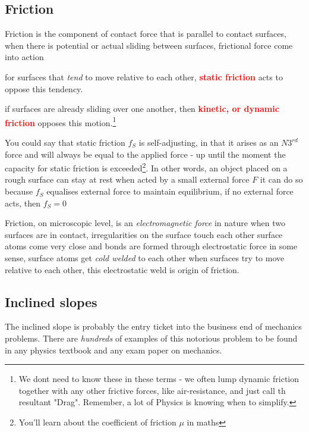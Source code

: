 \documentclass[a4paper,12pt]{book}
\newcounter{example}[chapter]
\newcommand{\piste}{{\fontencoding{U}\fontfamily{futs}\selectfont\char 49\relax}}
\newcommand{\keypoint}[1]{\textbf{\textcolor{red}{#1}}}
\newcommand{\titem}{\item}
\newcommand{\piste}{\textsuperscript{$\star$}}
\newcommand{\keypoint}[1]{\textbf{\textcolor{red}{#1}}}
\begin{document}
\subsection{Friction}

Friction is the component of contact force that is parallel to contact surfaces, when there is potential or actual sliding between surfaces, frictional force come into action

\titem for surfaces that \emph{tend} to move relative to each other, \keypoint{static friction} acts to oppose this tendency.

\titem if surfaces are already sliding over one another, then \keypoint{kinetic, or dynamic friction} opposes this motion.\footnote{\piste We dont need to know these in these terms - we often lump dynamic friction together with any other frictive forces, like air-resistance, and just call th resultant "Drag". Remember, a lot of Physics is knowing when to simplify.}

You could say that static friction $f_S$ is self-adjusting, in that it arises as an $N3^{rd}$ force and will always be equal to the applied force - up until the moment the capacity for static friction is exceeded\footnote{You'll learn about the coefficient of friction $\mu$ in maths}.
In other words, an object placed on a rough surface can stay at rest when acted by a small external force $F$ it can do so because $f_S$ equalises external force to maintain equilibrium, if no external force acts, then $f_S=0$

Friction, on microscopic level, is an \emph{electromagnetic force} in nature when two surfaces are in contact, irregularities on the surface touch each other surface atoms come very close and bonds are formed through electrostatic force in some sense, surface atoms get \emph{cold welded} to each other when surfaces try to move relative to each other, this electrostatic weld is origin of friction.

\subsection{Inclined slopes}

The inclined slope is probably the entry ticket into the business end of mechanics problems. There are \emph{hundreds} of examples of this notorious problem to be found in any physics textbook and any exam paper on mechanics.
\end{document}
